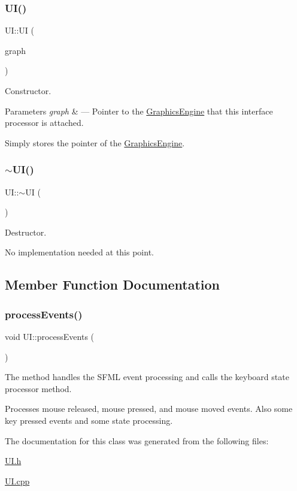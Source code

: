 \subsubsection{\texorpdfstring{U\+I()}{UI()}}
{\footnotesize\ttfamily U\+I\+::\+UI (\begin{DoxyParamCaption}\item[{\hyperlink{class_graphics_engine}{Graphics\+Engine} $\ast$}]{graph }\end{DoxyParamCaption})}



Constructor. 


\begin{DoxyParams}{Parameters}
{\em graph} & --- Pointer to the \hyperlink{class_graphics_engine}{Graphics\+Engine} that this interface processor is attached.\\
\hline
\end{DoxyParams}
Simply stores the pointer of the \hyperlink{class_graphics_engine}{Graphics\+Engine}. \mbox{\label{class_u_i_a1b23d0c64c7cbb3d143d90ec532a7ccd}} 
\subsubsection{\texorpdfstring{$\sim$\+U\+I()}{~UI()}}
{\footnotesize\ttfamily U\+I\+::$\sim$\+UI (\begin{DoxyParamCaption}{ }\end{DoxyParamCaption})}



Destructor. 

No implementation needed at this point. 

\subsection{Member Function Documentation}
\mbox{\label{class_u_i_a440e133dbf19d82b8b40809644494068}} 
\subsubsection{\texorpdfstring{process\+Events()}{processEvents()}}
{\footnotesize\ttfamily void U\+I\+::process\+Events (\begin{DoxyParamCaption}{ }\end{DoxyParamCaption})}



The method handles the S\+F\+ML event processing and calls the keyboard state processor method. 

Processes mouse released, mouse pressed, and mouse moved events. Also some key pressed events and some state processing. 

The documentation for this class was generated from the following files\+:\begin{DoxyCompactItemize}
\item 
\hyperlink{_u_i_8h}{U\+I.\+h}\item 
\hyperlink{_u_i_8cpp}{U\+I.\+cpp}\end{DoxyCompactItemize}
